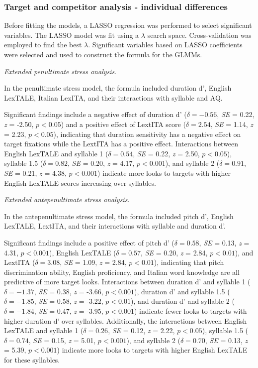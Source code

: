 \subsubsection{Target and competitor analysis - individual differences}

Before fitting the models, a LASSO regression was performed to select significant variables. The LASSO model was fit using a $\lambda$ search space. Cross-validation was employed to find the best $\lambda$. Significant variables based on LASSO coefficients were selected and used to construct the formula for the GLMMs.

\textit{Extended penultimate stress analysis}. 

In the penultimate stress model, the formula included duration d', English LexTALE, Italian LexITA, and their interactions with syllable and AQ. 

Significant findings include a negative effect of duration d' ($\delta = -0.56$, \textit{SE} = 0.22, \textit{z} = -2.50, $p < 0.05$) and a positive effect of LextITA score ($\delta = 2.54$, \textit{SE} = 1.14, \textit{z} = 2.23, $p < 0.05$), indicating that duration sensitivity has a negative effect on target fixations while the LextITA has a positive effect. Interactions between English LexTALE and syllable 1 ($\delta = 0.54$, \textit{SE} = 0.22, \textit{z} = 2.50, $p < 0.05$), syllable 1.5 ($\delta = 0.82$, \textit{SE} = 0.20, \textit{z} = 4.17, $p < 0.001$), and syllable 2 ($\delta = 0.91$, \textit{SE} = 0.21, \textit{z} = 4.38, $p < 0.001$) indicate more looks to targets with higher English LexTALE scores increasing over syllables.

\textit{Extended antepenultimate stress analysis}.

In the antepenultimate stress model, the formula included pitch d', English LexTALE, LextITA, and their interactions with syllable and duration d'. 

Significant findings include a positive effect of pitch d' ($\delta = 0.58$, \textit{SE} = 0.13, \textit{z} = 4.31, $p < 0.001$), English LexTALE ($\delta = 0.57$, \textit{SE} = 0.20, \textit{z} = 2.84, $p < 0.01$), and LextITA ($\delta = 3.08$, \textit{SE} = 1.09, \textit{z} = 2.84, $p < 0.01$), indicating that pitch discrimination ability, English proficiency, and Italian word knowledge are all predictive of more target looks. Interactions between duration d' and syllable 1 ($\delta = -1.37$, \textit{SE} = 0.38, \textit{z} = -3.66, $p < 0.001$), duration d' and syllable 1.5 ($\delta = -1.85$, \textit{SE} = 0.58, \textit{z} = -3.22, $p < 0.01$), and duration d' and syllable 2 ($\delta = -1.84$, \textit{SE} = 0.47, \textit{z} = -3.95, $p < 0.001$) indicate fewer looks to targets with higher duration d' over syllables. Additionally, the interactions between English LexTALE and syllable 1 ($\delta = 0.26$, \textit{SE} = 0.12, \textit{z} = 2.22, $p < 0.05$), syllable 1.5 ($\delta = 0.74$, \textit{SE} = 0.15, \textit{z} = 5.01, $p < 0.001$), and syllable 2 ($\delta = 0.70$, \textit{SE} = 0.13, \textit{z} = 5.39, $p < 0.001$) indicate more looks to targets with higher English LexTALE for these syllables. 

